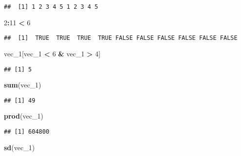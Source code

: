\documentclass[
]{article}
\newenvironment{Shaded}{\begin{snugshade}}{\end{snugshade}}
\newcommand{\DecValTok}[1]{\textcolor[rgb]{0.00,0.00,0.81}{#1}}
\newcommand{\FunctionTok}[1]{\textcolor[rgb]{0.13,0.29,0.53}{\textbf{#1}}}
\newcommand{\NormalTok}[1]{#1}
\newcommand{\SpecialCharTok}[1]{\textcolor[rgb]{0.81,0.36,0.00}{\textbf{#1}}}
\begin{document}
\begin{verbatim}
##  [1] 1 2 3 4 5 1 2 3 4 5
\end{verbatim}

\begin{Shaded}
\begin{Highlighting}[]
\DecValTok{2}\SpecialCharTok{:}\DecValTok{11} \SpecialCharTok{\textless{}} \DecValTok{6}
\end{Highlighting}
\end{Shaded}

\begin{verbatim}
##  [1]  TRUE  TRUE  TRUE  TRUE FALSE FALSE FALSE FALSE FALSE FALSE
\end{verbatim}

\begin{Shaded}
\begin{Highlighting}[]
\NormalTok{vec\_1[vec\_1 }\SpecialCharTok{\textless{}} \DecValTok{6} \SpecialCharTok{\&}\NormalTok{ vec\_1 }\SpecialCharTok{\textgreater{}} \DecValTok{4}\NormalTok{]}
\end{Highlighting}
\end{Shaded}

\begin{verbatim}
## [1] 5
\end{verbatim}

\begin{Shaded}
\begin{Highlighting}[]
\FunctionTok{sum}\NormalTok{(vec\_1)}
\end{Highlighting}
\end{Shaded}

\begin{verbatim}
## [1] 49
\end{verbatim}

\begin{Shaded}
\begin{Highlighting}[]
\FunctionTok{prod}\NormalTok{(vec\_1)}
\end{Highlighting}
\end{Shaded}

\begin{verbatim}
## [1] 604800
\end{verbatim}

\begin{Shaded}
\begin{Highlighting}[]
\FunctionTok{sd}\NormalTok{(vec\_1)}
\end{Highlighting}
\end{Shaded}
\end{document}
